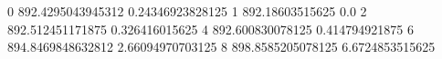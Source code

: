 0 892.4295043945312 0.24346923828125
1 892.18603515625 0.0
2 892.512451171875 0.326416015625
4 892.600830078125 0.414794921875
6 894.8469848632812 2.66094970703125
8 898.8585205078125 6.6724853515625
